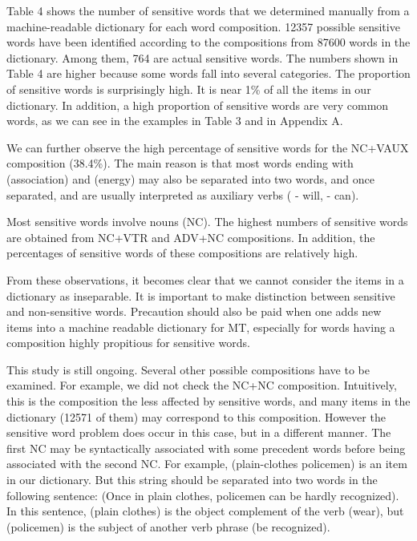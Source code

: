 Table 4 shows the number of sensitive words that we determined manually from a machine-readable dictionary for each 
word composition. 
12357 possible sensitive words have been identified 
according to the compositions from 87600 words in the dictionary. Among them, 764 are actual sensitive words. The 
numbers shown in Table 4 are higher because some words fall into several categories. The proportion of sensitive 
words is surprisingly high. It is near 1\% of all the items in our dictionary. In addition, a high proportion of sensitive 
words are very common words, as we can see in the examples in Table 3 and in Appendix A.

We can further observe the high percentage of sensitive words for the NC+VAUX composition (38.4\%). The main 
reason is that most words ending with    (association) and  (energy) may also be separated into two words, and once 
separated,    and   are usually interpreted as auxiliary verbs (  - will,   - can). 

Most sensitive words involve nouns (NC). The highest numbers of sensitive words are obtained from NC+VTR and 
ADV+NC compositions. In addition, the percentages of sensitive words of these compositions are relatively high. 

From these observations, it becomes clear that we cannot consider the items in a dictionary as inseparable. It is 
important to make distinction between sensitive and non-sensitive words. Precaution should also be paid when one 
adds new items into a machine readable dictionary for MT, especially for words having a composition highly propitious 
for sensitive words.

This study is still ongoing. Several other possible compositions have to be examined. For example, we did not check 
the NC+NC composition. Intuitively, this is the composition the less affected by sensitive words, and many items in the 
dictionary (12571 of them) may correspond to this composition. However the sensitive word problem does occur in this case, 
but in a different manner. The first NC may be syntactically associated with some $\!$precedent words before being 
associated with the second NC. For example,  (plain-clothes policemen) is an item in our dictionary. But this 
string should be separated into two words in the following sentence: 
(Once in plain clothes, policemen can be hardly recognized). 
In this sentence,   (plain clothes) is the object complement of 
the verb  (wear), but  (policemen) is the subject of another verb phrase  (be recognized).

